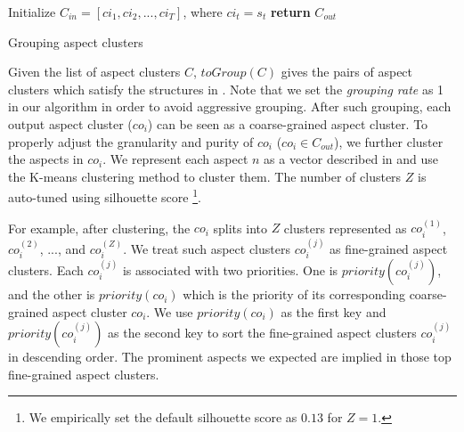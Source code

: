\begin{algorithm}[!th]
	\small
	\BlankLine
	Initialize $C_{in}=[ci_1, ci_2, ..., ci_T]$, where $ci_t = s_t$\;
	{\bf return} $C_{out}$\;
	\caption{Grouping aspect clusters\label{alg:grouping}}
\end{algorithm}

Given the list of aspect clusters $C$, 
$toGroup(C)$ gives the pairs of aspect clusters which
satisfy the structures in .
Note that we set the \textit{grouping rate} as 1 in our algorithm
in order to avoid aggressive grouping.
After such grouping, each output aspect cluster ($co_{i}$)
can be seen as a coarse-grained aspect cluster.
To properly adjust the granularity and purity of $co_{i}$ 
($co_{i} \in C_{out}$),
we further cluster the aspects in $co_i$.
We represent each aspect $n$ as a vector described
in 
and use the K-means clustering method 
to cluster them.
The number of clusters $Z$ is auto-tuned using
silhouette score \cite{rousseeuw1987silhouettes}
\footnote{We empirically set the default silhouette score as $0.13$ for $Z=1$.}.

For example, after clustering, 
the $co_i$ splits into $Z$ clusters represented as
$co_i^{(1)}$, $co_i^{(2)}$, ..., 
and $co_i^{(Z)}$.
We treat such aspect clusters $co_i^{(j)}$ as 
fine-grained aspect clusters.
Each $co_i^{(j)}$ is associated with two priorities.
One is $priority(co_i^{(j)})$,
and the other is $priority(co_i)$ 
which is the priority of its corresponding
coarse-grained aspect cluster $co_i$.
We use $priority(co_i)$ as the first key and 
$priority(co_i^{(j)})$ as the second key to
sort the fine-grained aspect clusters $co_i^{(j)}$ in descending order.
The prominent aspects we expected are implied in those top 
fine-grained aspect clusters.

